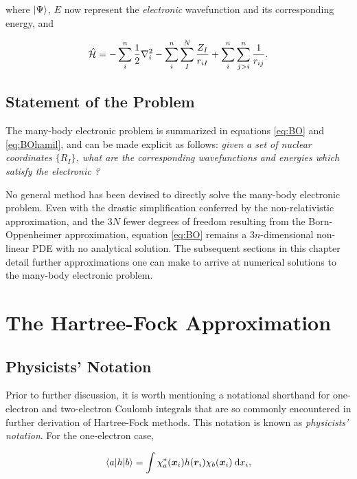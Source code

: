 \noindent where $\ket\Psi$, $E$ now represent the \emph{electronic} wavefunction
and its corresponding energy, and

\begin{equation}
\hat{\mathcal{H}} = - \sum_i^n \frac{1}{2} \nabla_i^2
	 - \sum_i^n \sum_I^N \frac{Z_I}{r_{iI}}
	 + \sum_i^n \sum_{j > i}^n \frac{1}{r_{ij}}.
\label{eq:BOhamil}
\end{equation}

\subsection{Statement of the Problem}

The many-body electronic problem is summarized in equations \ref{eq:BO} and
\ref{eq:BOhamil}, and can be made explicit as follows: \emph{given a set of
nuclear coordinates $\{ R_I \}$, what are the corresponding wavefunctions and
energies which satisfy the electronic \SE ?}

No general method has been devised to directly solve the many-body electronic
problem. Even with the drastic simplification conferred by the non-relativistic
approximation, and the $3N$ fewer degrees of freedom resulting from the
Born-Oppenheimer approximation, equation \ref{eq:BO} remains a $3n$-dimensional
non-linear PDE with no analytical solution. The subsequent sections in this
chapter detail further approximations one can make to arrive at numerical
solutions to the many-body electronic problem.

\section{The Hartree-Fock Approximation}
\label{s:hf}

\subsection{Physicists' Notation}

Prior to further discussion, it is worth mentioning a notational shorthand for
one-electron and two-electron Coulomb integrals that are so commonly encountered
in further derivation of Hartree-Fock methods. This notation is known as
\emph{physicists' notation}. For the one-electron case,

\begin{equation}
	\braket{a|h|b} = \int \chi_a^* (\bm x_i) h(\bm r_i) \chi_b (\bm x_i) \:\mathrm{d} x_i,
\end{equation}

